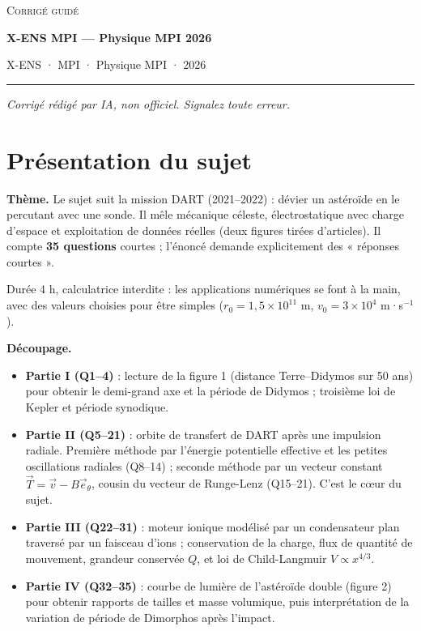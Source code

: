 \documentclass[11pt,a4paper]{article}
\providecommand{\tightlist}{\setlength{\itemsep}{0pt}\setlength{\parskip}{0pt}}
\begin{document}
\thispagestyle{plain}
\begin{center}
  {\small\scshape Corrigé guidé}\par\smallskip
  {\LARGE\bfseries X-ENS MPI — Physique MPI 2026\par}\medskip
  {\large X-ENS · MPI · Physique MPI · 2026\par}
\end{center}
\vspace{2pt}\hrule\vspace{8pt}

\emph{Corrigé rédigé par IA, non officiel. Signalez toute erreur.}

\hypertarget{pruxe9sentation-du-sujet}{%
\section{Présentation du sujet}\label{pruxe9sentation-du-sujet}}

\textbf{Thème.} Le sujet suit la mission DART (2021--2022) : dévier un astéroïde en le percutant avec une sonde. Il mêle mécanique céleste, électrostatique avec charge d'espace et exploitation de données réelles (deux figures tirées d'articles). Il compte \textbf{35 questions} courtes ; l'énoncé demande explicitement des « réponses courtes ».

Durée 4 h, calculatrice interdite : les applications numériques se font à la main, avec des valeurs choisies pour être simples (\(r_0=1{,}5\times10^{11}\) m, \(v_0=3\times10^4\) m·s\(^{-1}\)).

\textbf{Découpage.}

\begin{itemize}
\tightlist
\item
  \textbf{Partie I (Q1--4)} : lecture de la figure 1 (distance Terre--Didymos sur 50 ans) pour obtenir le demi-grand axe et la période de Didymos ; troisième loi de Kepler et période synodique.
\item
  \textbf{Partie II (Q5--21)} : orbite de transfert de DART après une impulsion radiale. Première méthode par l'énergie potentielle effective et les petites oscillations radiales (Q8--14) ; seconde méthode par un vecteur constant \(\vec T=\vec v-B\vec e_\theta\), cousin du vecteur de Runge-Lenz (Q15--21). C'est le cœur du sujet.
\item
  \textbf{Partie III (Q22--31)} : moteur ionique modélisé par un condensateur plan traversé par un faisceau d'ions ; conservation de la charge, flux de quantité de mouvement, grandeur conservée \(Q\), et loi de Child-Langmuir \(V\propto x^{4/3}\).
\item
  \textbf{Partie IV (Q32--35)} : courbe de lumière de l'astéroïde double (figure 2) pour obtenir rapports de tailles et masse volumique, puis interprétation de la variation de période de Dimorphos après l'impact.
\end{itemize}
\end{document}

